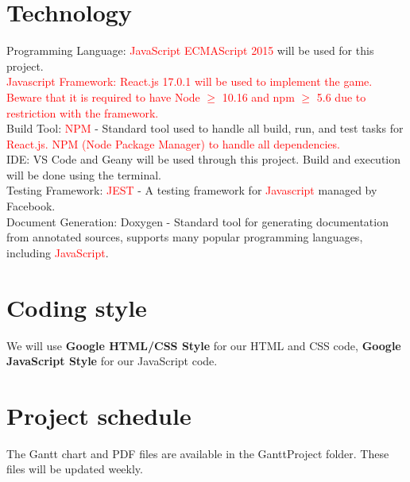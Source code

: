 \documentclass{article}
\begin{document}
\section{Technology}
Programming Language: \textcolor{red}{JavaScript ECMAScript 2015} will be used for this project.\\
\textcolor{red}{Javascript Framework: React.js 17.0.1 will be used to implement the game. Beware that it is required to have Node $\geq$ 10.16 and npm $\geq$ 5.6 due to restriction with the framework.}\\
Build Tool: \textcolor{red}{NPM} - Standard tool used to handle all build, run, and test tasks for \textcolor{red}{React.js. NPM (Node Package Manager) to handle all dependencies.}\\
IDE: VS Code and Geany will be used through this project. Build and execution will be done using the terminal.\\
Testing Framework: \textcolor{red}{JEST} - A testing framework for \textcolor{red}{Javascript} managed by Facebook.\\
Document Generation: Doxygen - Standard tool for generating documentation from annotated sources, supports many popular programming languages, including \textcolor{red}{JavaScript}.\\


\section{Coding style}
We will use \textbf{Google HTML/CSS Style} for our HTML and CSS code, \textbf{Google JavaScript Style} for our JavaScript code.

\section{Project schedule}
The Gantt chart and PDF files are available in the GanttProject folder. These files will be updated weekly.
\end{document}

